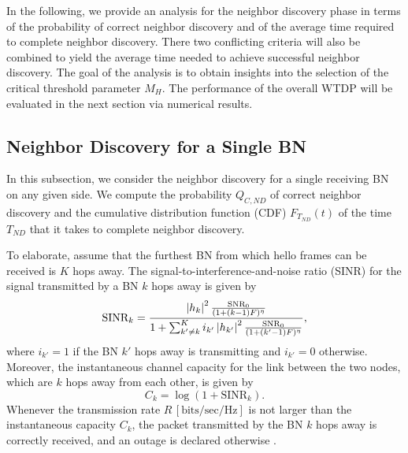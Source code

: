 \documentclass[10pt,english,two column]{IEEEtran}
\begin{document}
In the following, we provide an analysis for the neighbor discovery
phase in terms of the probability of correct neighbor discovery and
of the average time required to complete neighbor discovery. There
two conflicting criteria will also be combined to yield the average
time needed to achieve successful neighbor discovery. The goal of
the analysis is to obtain insights into the selection of the critical
threshold parameter $M_{H}$. The performance of the overall WTDP
will be evaluated in the next section via numerical results. 


\subsection{Neighbor Discovery for a Single BN }

In this subsection, we consider the neighbor discovery for a single
receiving BN on any given side. We compute the probability $Q_{C,ND}$
of correct neighbor discovery and the cumulative distribution function
(CDF) $F_{T_{ND}}\left(t\right)$ of the time $T_{ND}$ that it takes
to complete neighbor discovery. 

To elaborate, assume that the furthest BN from which hello frames
can be received is $K$ hops away. The signal-to-interference-and-noise
ratio (SINR) for the signal transmitted by a BN $k$ hops away is
given by 
\begin{equation}
\mathrm{SIN}\mathrm{R}_{k}=\frac{\left|h_{k}\right|^{2}\frac{\textrm{\ensuremath{\mathrm{SNR_{0}}}}}{(1+(k-1)F)^{\eta}}}{1+\sum_{k'\neq k}^{K}i_{k'}\left|h_{k'}\right|^{2}\frac{\textrm{\ensuremath{\mathrm{SNR}_{0}}}}{(1+(k'-1)F)^{\eta}}},\label{eq:SINR}
\end{equation}
where $i_{k'}=1$ if the BN $k'$ hops away is transmitting and $i_{k'}=0$
otherwise. Moreover, the instantaneous channel capacity for the link
between the two nodes, which are $k$ hops away from each other, is
given by \cite{cover} 
\begin{equation}
C_{k}=\log\left(1+\mathrm{SINR}_{k}\right).\label{eq:capacity}
\end{equation}
Whenever the transmission rate $\mathrm{\mathit{R\,}[bits/sec/Hz]}$
is not larger than the instantaneous capacity $C_{k}$, the packet
transmitted by the BN $k$ hops away is correctly received, and an
outage is declared otherwise \cite{Tse}. 
\end{document}
